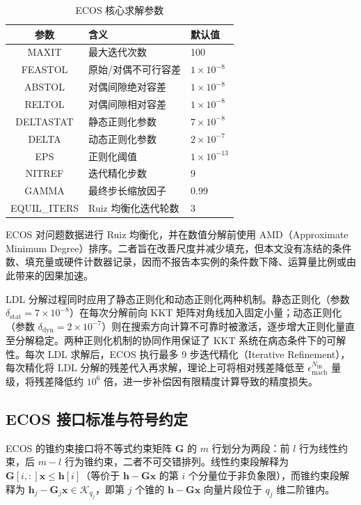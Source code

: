 \begin{table}[H]
\centering
\caption{ECOS 核心求解参数}
\label{tab:ecos_params}
\begin{tabular}{cll}
\toprule
参数 & 含义 & 默认值 \\
\midrule
MAXIT   & 最大迭代次数              & 100 \\
FEASTOL & 原始/对偶不可行容差        & $1\times 10^{-8}$ \\
ABSTOL  & 对偶间隙绝对容差           & $1\times 10^{-8}$ \\
RELTOL  & 对偶间隙相对容差           & $1\times 10^{-8}$ \\
DELTASTAT & 静态正则化参数           & $7\times 10^{-8}$ \\
DELTA   & 动态正则化参数             & $2\times 10^{-7}$ \\
EPS     & 正则化阈值                & $1\times 10^{-13}$ \\
NITREF  & 迭代精化步数              & 9 \\
GAMMA   & 最终步长缩放因子           & 0.99 \\
EQUIL\_ITERS & Ruiz 均衡化迭代轮数   & 3 \\
\bottomrule
\end{tabular}
\end{table}

ECOS 对问题数据进行 Ruiz 均衡化，并在数值分解前使用 AMD（Approximate Minimum Degree）排序。二者旨在改善尺度并减少填充，但本文没有冻结的条件数、填充量或硬件计数器记录，因而不报告本实例的条件数下降、运算量比例或由此带来的因果加速。

LDL 分解过程同时应用了静态正则化和动态正则化两种机制。静态正则化（参数 $\delta_{\text{stat}} = 7\times 10^{-8}$）在每次分解前向 KKT 矩阵对角线加入固定小量；动态正则化（参数 $\delta_{\text{dyn}} = 2\times 10^{-7}$）则在搜索方向计算不可靠时被激活，逐步增大正则化量直至分解稳定。两种正则化机制的协同作用保证了 KKT 系统在病态条件下的可解性。每次 LDL 求解后，ECOS 执行最多 9 步迭代精化（Iterative Refinement），每次精化将 LDL 分解的残差代入再求解，理论上可将相对残差降低至 $\epsilon_{\text{mach}}^{N_{\text{IR}}}$ 量级，将残差降低约 $10^6$ 倍，进一步补偿因有限精度计算导致的精度损失。

\subsection{ECOS 接口标准与符号约定}

ECOS 的锥约束接口将不等式约束矩阵 $\bm{G}$ 的 $m$ 行划分为两段：前 $l$ 行为线性约束，后 $m-l$ 行为锥约束，二者不可交错排列。线性约束段解释为 $\bm{G}[i,:]{\bm{x}} \leq \bm{h}[i]$（等价于 $\bm{h} - \bm{G}{\bm{x}}$ 的第 $i$ 个分量位于非负象限），而锥约束段解释为 $\bm{h}_j - \bm{G}_j{\bm{x}} \in \mathcal{K}_{q_j}$，即第 $j$ 个锥的 $\bm{h} - \bm{G}{\bm{x}}$ 向量片段位于 $q_j$ 维二阶锥内。


